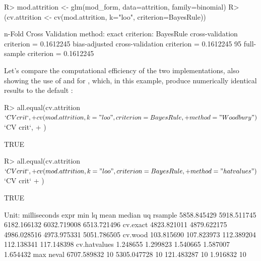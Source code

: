 \documentclass[
]{jss}
\begin{document}
\begin{CodeChunk}
\begin{CodeInput}
R> mod.attrition <- glm(mod_form, data=attrition, family=binomial)
R> (cv.attrition <- cv(mod.attrition, k="loo", criterion=BayesRule))
\end{CodeInput}
\begin{CodeOutput}
n-Fold Cross Validation
method: exact
criterion: BayesRule
cross-validation criterion = 0.1612245
bias-adjusted cross-validation criterion = 0.1612245
95%
full-sample criterion = 0.1612245 
\end{CodeOutput}
\end{CodeChunk}

Let's compare the computational efficiency of the two implementations,
also showing the use of  and
 for , which, in this example,
produce numerically identical results to the default
:

\begin{CodeChunk}
\begin{CodeInput}
R> all.equal(cv.attrition$`CV crit`,
+           cv(mod.attrition, k="loo", criterion=BayesRule,
+              method="Woodbury")$`CV crit`,
+           )
\end{CodeInput}
\begin{CodeOutput}
[1] TRUE
\end{CodeOutput}
\begin{CodeInput}
R> all.equal(cv.attrition$`CV crit`,
+           cv(mod.attrition, k="loo", criterion=BayesRule,
+              method="hatvalues")$`CV crit`
+           )
\end{CodeInput}
\begin{CodeOutput}
[1] TRUE
\end{CodeOutput}
\begin{CodeOutput}
Unit: milliseconds
         expr         min          lq        mean      median          uq
      rsample 5858.845429 5918.511745 6182.166132 6032.719008 6513.721496
     cv.exact 4823.821011 4879.622175 4986.028516 4973.975331 5051.786505
      cv.wood  103.815690  107.823973  112.389204  112.138341  117.148398
 cv.hatvalues    1.248655    1.299823    1.540665    1.587007    1.654432
         max neval
 6707.589832    10
 5305.047728    10
  121.483287    10
    1.916832    10
\end{CodeOutput}
\end{CodeChunk}
\end{document}
